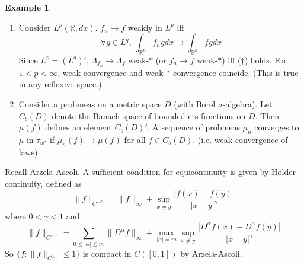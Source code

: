 \documentclass{article}
\theoremstyle{definition}
\newtheorem{example}[defn]{Example}
\theoremstyle{remark}
\theoremstyle{plain}
\newcommand{\RR}{\mathbb{R}}
\begin{document}
\begin{example}\
    \begin{enumerate}[1)]
        \item Consider $L^p(\RR,dx)$. $f_n\to f$ weakly in $L^p$ iff \[\forall g\in L^q,\ \int_{\RR^n}f_ngdx\to\int_{\RR^n}fgdx\tag{$\dagger$}\]
        Since $L^p=(L^q)'$, $\Lambda_{f_n}\to\Lambda_{f}$ weak-$\ast$ (or $f_n\to f$ weak-$\ast$) iff ($\dagger$) holds. For $1<p<\infty$, weak convergence and weak-$\ast$ convergence coincide. (This is true in any reflexive space.)
        \item Consider a probmeas on a metric space $D$ (with Borel $\sigma$-algebra). Let $C_b(D)$ denote the Banach space of bounded cts functions on $D$. Then $\mu(f)$ defines an element $C_b(D)'$. A sequence of probmeas $\mu_n$ converges to $\mu$ in $\tau_{w^\ast}$ if $\mu_n(f)\to \mu(f)$ for all $f\in C_b(D)$. (i.e. weak convergence of laws)
    \end{enumerate}
\end{example}
Recall Arzela-Ascoli. A sufficient condition for equicontinuity is given by H\"older continuity, defined as
\[\|f\|_{C^{0,\gamma}}=\|f\|_\infty+\sup_{x\neq y}\dfrac{|f(x)-f(y)|}{|x-y|^\gamma}\]
where $0<\gamma<1$ and 
\[\|f\|_{C^{m,\gamma}}=\sum_{0\le|\alpha|\le m}\|D^\alpha f\|_\infty+\max_{|\alpha|=m}\sup_{x\neq y}\dfrac{|D^\alpha f(x)-D^\alpha f(y)|}{|x-y|^\gamma}\]
So $\{f:\|f\|_{C^{0,\gamma}}\le 1\}$ is compact in $C([0,1])$ by Arzela-Ascoli.
\end{document}
